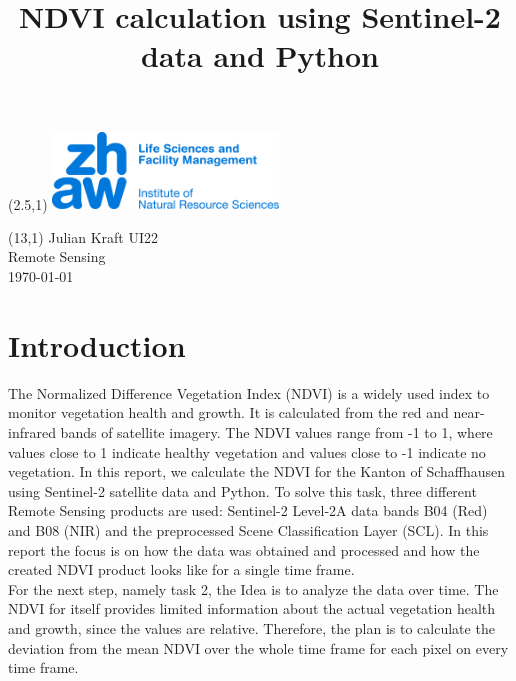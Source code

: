 \documentclass{article}
\title{NDVI calculation using Sentinel-2 data and Python}
\makeatletter
\renewcommand{\maketitle}{
  \begin{flushleft} 
    \Large\textmd{\@title} 
    \par
  \end{flushleft}
}
\makeatother
\begin{document}
\begin{textblock}{1}(2.5,1) %
        \includegraphics[width=6cm]{logo.jpg} %
\end{textblock}

\begin{textblock}{6}(13,1) %
        \raggedleft
        Julian Kraft UI22\\
        Remote Sensing\\
        \today
\end{textblock}

\vspace*{1.5cm}


\maketitle

\section*{Introduction}

The Normalized Difference Vegetation Index (NDVI) is a widely used index to monitor vegetation health and growth. 
It is calculated from the red and near-infrared bands of satellite imagery. The NDVI values range from -1 to 1, 
where values close to 1 indicate healthy vegetation and values close to -1 indicate no vegetation. In this report, 
we calculate the NDVI for the Kanton of Schaffhausen using Sentinel-2 satellite data and Python. To solve this task,
three different Remote Sensing products are used: Sentinel-2 Level-2A data bands B04 (Red) and B08 (NIR) and the
preprocessed Scene Classification Layer (SCL). In this report the focus is on how the data was obtained and processed
and how the created NDVI product looks like for a single time frame.\\

For the next step, namely task 2, the Idea is to analyze the data over time. The NDVI for itself provides limited information
about the actual vegetation health and growth, since the values are relative. Therefore, the plan is to calculate the 
deviation from the mean NDVI over the whole time frame for each pixel on every time frame. 
\end{document}
